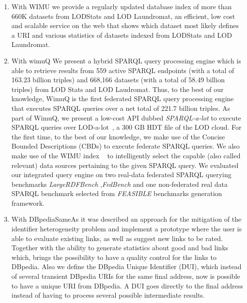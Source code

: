\begin{enumerate}
    \item With WIMU\cite{valdestilhas2018my} we provide a regularly updated database index of more than 660K datasets from LODStats and LOD Laundromat, an efficient, low cost and scalable service on the web that shows which dataset most likely defines a URI and various statistics of datasets indexed from LODStats and LOD Laundromat.
    
    \item With wimuQ\cite{ValdestilhasKcap} We present a hybrid SPARQL query processing engine which is able to retrieve results from 559 active SPARQL endpoints (with a total of 163.23 billion triples) and 668,166 datasets (with a total of 58.49 billion triples) from LOD Stats and LOD Laudromat. Thus, to the best of our knowledge, WimuQ is the first federated SPARQL query processing engine that executes SPARQL queries over a net total of 221.7 billion triples. As part of WimuQ, we present a low-cost API dubbed \emph{SPARQL-a-lot} to execute SPARQL queries over LOD-a-lot~\cite{fernandez2017lod}, a 300 GB HDT file of the LOD cloud. For the first time, to the best of our knowledge, we make use of the Concise Bounded Descriptions (CBDs) to execute federate SPARQL queries. We also make use of the WIMU index ~\cite{valdestilhas2018my} to intelligently select the capable (also called relevant) \cite{hibiscus2014} data sources pertaining to the given SPARQL query. We evaluated our integrated query engine on two real-data federated SPARQL querying benchmarks \emph{LargeRDFBench} \cite{largerdfbench2017},\emph{FedBench} \cite{fedbench2011} and one non-federated real data SPARQL benchmark selected from \emph{FEASIBLE} \cite{feasible2015} benchmarks generation framework.
    
    \item With DBpediaSameAs\cite{valdestilhas2015dbpediasameas} it was described an approach for the mitigation of the identifier heterogeneity problem and implement a prototype where the user is able to evaluate existing links, as well as suggest new links to be rated. Together with the ability to generate statistics about good and bad links which, brings the possibility to have a quality control for the links to DBpedia. Also we define the DBpedia Unique Identifier (DUI), which instead of several transient  DBpedia URIs for the same final address, now is possible to have a unique URI from DBpedia. A DUI goes directly to the final address instead of having to process several possible intermediate results.
    

\end{enumerate}
